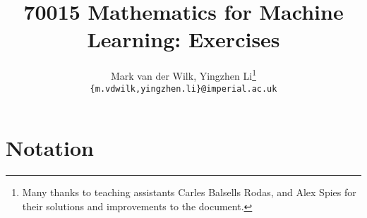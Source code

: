 \documentclass[a4paper]{article}
\title{70015 Mathematics for Machine Learning: Exercises}
\author{Mark van der Wilk, Yingzhen Li\footnote{Many thanks to teaching assistants Carles Balsells Rodas, and Alex Spies for their solutions and improvements to the document.} \\ \texttt{\{m.vdwilk,yingzhen.li\}@imperial.ac.uk}}
\theoremstyle{definition}
\begin{document}
\maketitle
\tableofcontents






\section{Notation}
\end{document}
